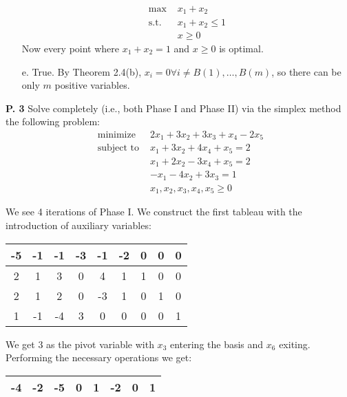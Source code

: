 \documentclass{article}
\begin{document}
\begin{jacklist}
\begin{itemize}
            \begin{align*}
                \text{max } & x_1 + x_2 \\
                \text{s.t. } & x_1 + x_2 \leq 1 \\
                            &x \geq 0
            \end{align*} 
            Now every point where $x_1 + x_2 = 1$ and $x \geq 0$ is optimal. 
        \item [e.] True. By Theorem 2.4(b), $x_i = 0 \forall i \neq B(1),\ldots,B(m)$, so there can be only $m$ positive variables. 
    \end{itemize}
\newpage
    \begin{framed} 
    \item [\textbf{P. 3}] Solve completely (i.e., both Phase I and Phase II) via the simplex method the following problem: 
    \[ 
        \begin{array}{rc}
        \text { minimize } & 2 x_{1}+3 x_{2}+3 x_{3}+x_{4}-2 x_{5} \\
        \text { subject to } & x_{1}+3 x_{2}+4 x_{4}+x_{5}=2 \\
        & x_{1}+2 x_{2}-3 x_{4}+x_{5}=2 \\
        & -x_{1}-4 x_{2}+3 x_{3}=1 \\
        & x_{1}, x_{2}, x_{3}, x_{4}, x_{5} \geq 0
        \end{array}
    \] 
    \end{framed}
    We see 4 iterations of Phase I. We construct the first tableau with the introduction of auxiliary variables: 
    \begin{center}
        \begin{tabular}{|c|cccccccc|}
            \hline
            -5&-1&-1&-3&-1&-2&0&0&0\\
            \hline
            2&1&3&0&4&1&1&0&0\\
            2&1&2&0&-3&1&0&1&0\\
            1&-1&-4&3&0&0&0&0&1\\
            \hline
        \end{tabular}
    \end{center}
    We get 3 as the pivot variable with $x_3$ entering the basis and $x_6$ exiting. Performing the necessary operations we get:
    \begin{center}
        \begin{tabular}{|c|ccccccc|}
            \hline
            -4&-2&-5&0&1&-2&0&1\\
            \hline

\end{tabular}
\end{center}
\end{jacklist}
\end{document}
